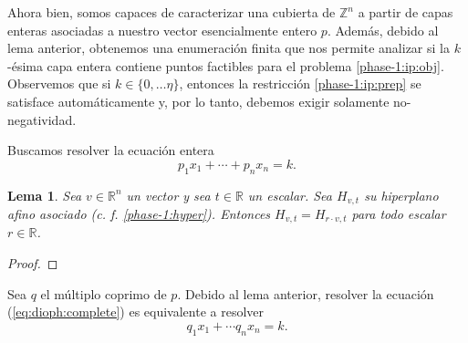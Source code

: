 \documentclass[11pt]{article}
\newtheorem{lemma}{Lema}
\begin{document}
Ahora bien, somos capaces de caracterizar una cubierta de $\mathbb{Z}^n$ a partir de capas enteras
asociadas a nuestro vector esencialmente entero $p$. Además, debido al lema anterior, obtenemos una
enumeración finita que nos permite analizar si la $k$-ésima capa entera contiene puntos factibles
para el problema \ref{phase-1:ip:obj}. Observemos que si $k \in \lbrace 0, \ldots \eta \rbrace$,
entonces la restricción \ref{phase-1:ip:prep} se satisface automáticamente y, por lo tanto, debemos
exigir solamente no-negatividad.

Buscamos resolver la ecuación entera
\begin{equation}
	\label{eq:dioph:complete}
	p_1x_1 + \cdots + p_nx_n = k.
\end{equation}

\begin{lemma}
	\label{phase-1:lemma:invariance}
	Sea $v \in \mathbb{R}^n$ un vector y sea $t \in \mathbb{R}$ un escalar. Sea $H_{v, t}$ su
	hiperplano afino asociado (c. f. \ref{phase-1:hyper}). Entonces $H_{v, t} = H_{r \cdot v, t}$
	para todo escalar $r \in \mathbb{R}$.
\end{lemma}
\begin{proof}
\end{proof}

Sea $q$ el múltiplo coprimo de $p$. Debido al lema anterior, resolver la ecuación
(\ref{eq:dioph:complete}) es equivalente a resolver
\begin{equation}
	\label{eq:dioph:complete:coprime}
	q_1x_1 + \cdots q_nx_n = k.
\end{equation}
\end{document}
